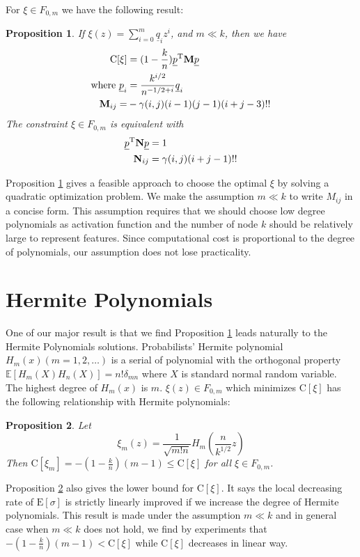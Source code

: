 \documentclass[conference]{IEEEtran}
\newtheorem{proposition}{Proposition}
\def\E{\mathbb{E}}
\def\T{\mathrm{T}}
\newcommand{\ide}[2]{ \gamma(#1,#2) }
\begin{document}
For $\xi \in F_{0,m}$ we have the following result:
\begin{proposition}\label{prop:quadratic}
If
$\xi(z) = \sum_{i=0}^m \underline{q}_i z^i$,
and $m \ll k$, then we have 
\begin{align}
\mathrm{C}[\xi] &= (1-\frac{k}{n}) \underline{p}^\T \mathbf{M} \underline{p} \notag\\
\textrm{where }\underline{p}_i &= \frac{k^{i/2}}{n^{- 1/2 + i}}\underline{q}_i\label{eq:pqt} \\
\mathbf{M}_{ij} =& -\ide{i}{j}(i-1)(j-1)(i+j-3)!! \notag
\end{align}
The constraint $\xi \in F_{0,m}$ is equivalent with
\begin{align}
\underline{p}^\T \mathbf{N} \underline{p} & = 1 \notag\\
\mathbf{N}_{ij}  & = \ide{i}{j}(i+j-1)!!
\end{align}
\end{proposition}

Proposition \ref{prop:quadratic} gives a feasible approach to choose the optimal $\xi$ by solving a quadratic optimization problem. We make the assumption $
m \ll k$ to write $M_{ij}$ in a concise form. This assumption requires that we should choose low degree polynomials as activation function and the number of node $k$ should be relatively large to represent features. Since computational cost
is proportional to the degree of polynomials, our assumption does not lose practicality. 

\section{Hermite Polynomials}\label{sec:hp}

One of our major result is that we find Proposition \ref{prop:quadratic} leads naturally to the Hermite Polynomials solutions. Probabilists' Hermite polynomial $H_m(x) (m=1,2,\dots)$ is a serial of polynomial with the orthogonal property $ \E[H_m(X)H_n(X)] = n! \delta_{mn}$ where $X$ is standard normal random variable.
The highest degree of $H_m(x)$ is $m$. $\xi(z) \in F_{0, m}$ which minimizes $\mathrm{C}[\xi]$ has the following relationship with Hermite polynomials:
\begin{proposition}\label{prop:value}
Let
\begin{equation}\label{eq:ximopt}
    \xi_m(z) = \frac{1}{\sqrt{m!n}} H_m(\frac{n}{k^{1/2}} z)
\end{equation}
Then $\mathrm{C}[\xi_m] = -(1-\frac{k}{n})(m-1) \leq \mathrm{C}[\xi] $ for all $\xi \in F_{0, m}$.
\end{proposition}
Proposition \ref{prop:value} also gives the lower bound for $\mathrm{C}[\xi]$.
It says the local decreasing rate of $\mathrm{E}[\sigma]$ is strictly linearly improved if we increase the degree of Hermite polynomials. This result is made under the assumption $ m \ll k$ and in general case when $ m \ll k$ does not hold, we find by experiments that $-(1-\frac{k}{n})(m-1) < \mathrm{C}[\xi]$ while $\mathrm{C}[\xi]$ decreases in linear way.
\end{document}

